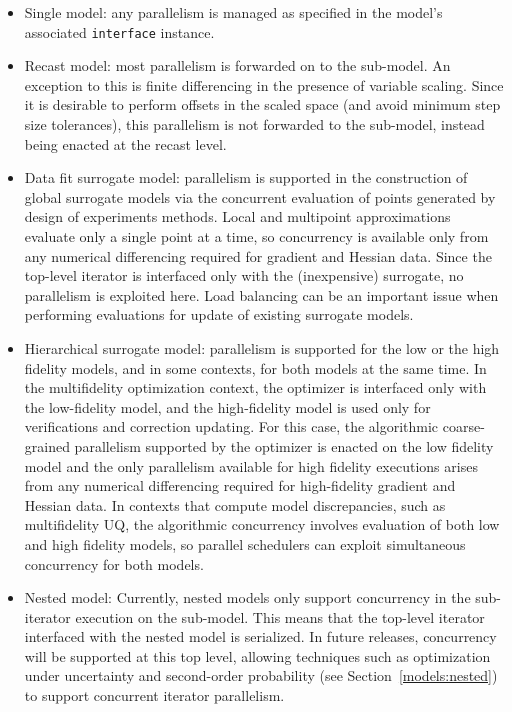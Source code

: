 \begin{itemize}
\item Single model: any parallelism is managed as specified in the
model's associated \texttt{interface} instance.

\item Recast model: most parallelism is forwarded on to the sub-model.
An exception to this is finite differencing in the presence of
variable scaling.  Since it is desirable to perform offsets in the
scaled space (and avoid minimum step size tolerances), this
parallelism is not forwarded to the sub-model, instead being enacted
at the recast level.

\item Data fit surrogate model: parallelism is supported in the
construction of global surrogate models via the concurrent evaluation
of points generated by design of experiments methods.  Local and
multipoint approximations evaluate only a single point at a time, so
concurrency is available only from any numerical differencing required
for gradient and Hessian data.  Since the top-level iterator is
interfaced only with the (inexpensive) surrogate, no parallelism is
exploited here.  Load balancing can be an important issue when
performing evaluations for update of existing surrogate models.

\item Hierarchical surrogate model: parallelism is supported for the 
low or the high fidelity models, and in some contexts, for both models
at the same time.  In the multifidelity optimization context, the
optimizer is interfaced only with the low-fidelity model, and the
high-fidelity model is used only for verifications and correction
updating.  For this case, the algorithmic coarse-grained parallelism
supported by the optimizer is enacted on the low fidelity model and
the only parallelism available for high fidelity executions arises
from any numerical differencing required for high-fidelity gradient
and Hessian data.  In contexts that compute model discrepancies, such
as multifidelity UQ, the algorithmic concurrency involves evaluation
of both low and high fidelity models, so parallel schedulers can
exploit simultaneous concurrency for both models.

\item Nested model: Currently, nested models only support concurrency
in the sub-iterator execution on the sub-model.  This means that the
top-level iterator interfaced with the nested model is serialized.  In
future releases, concurrency will be supported at this top level,
allowing techniques such as optimization under uncertainty and
second-order probability (see Section~\ref{models:nested}) to support
concurrent iterator parallelism.
\end{itemize}


